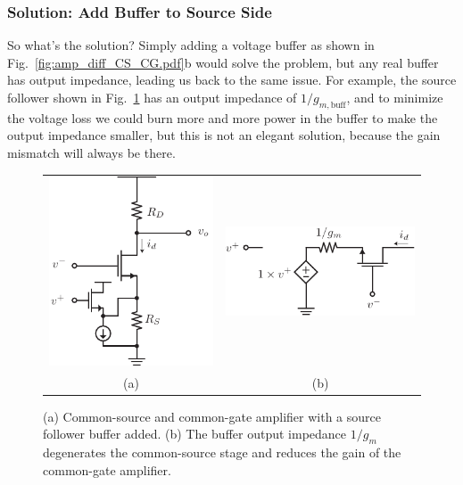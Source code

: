 \subsubsection{Solution:  Add Buffer to Source Side}
So what's the solution? Simply adding a voltage buffer as shown in Fig.~\ref{fig:amp_diff_CS_CG.pdf}b would solve the problem, but any real buffer has output impedance, leading us back to the same issue.  For example, the source follower shown in Fig.~\ref{fig:amp_diff_CS_CG_CD.pdf} has an output impedance of $1/g_{m,\text{buff}}$, and to minimize the voltage loss we could burn more and more power in the buffer to make the output impedance smaller, but this is not an elegant solution, because the gain mismatch will always be there.
\begin{figure}[tb]
\centering
\begin{tabular}{cc}
\includegraphics[scale=1]{amp_diff_CS_CG_CD.pdf} &
\includegraphics[scale=1]{amp_CG_CD_Model.pdf}\\
(a) & (b)\\
\end{tabular}
\caption{(a) Common-source and common-gate amplifier with a source follower buffer added.  (b) The buffer output impedance $1/g_m$ degenerates the common-source stage and reduces the gain of the common-gate amplifier.}
\label{fig:amp_diff_CS_CG_CD.pdf}
\end{figure}
